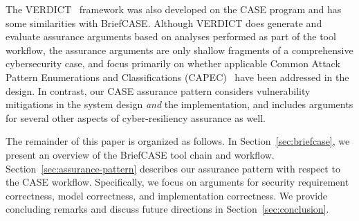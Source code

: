 The VERDICT~\cite{verdict} framework was also developed on the CASE program and has some similarities with BriefCASE.  Although VERDICT does generate and evaluate assurance arguments based on analyses performed as part of the tool workflow, the assurance arguments are only shallow fragments of a comprehensive cybersecurity case, and focus primarily on whether applicable Common Attack Pattern Enumerations and Classifications (CAPEC)~\cite{capec} have been addressed in the design.  In contrast, our CASE assurance pattern considers vulnerability mitigations in the system design \textit{and} the implementation, and includes arguments for several other aspects of cyber-resiliency assurance as well.

The remainder of this paper is organized as follows. In Section~\ref{sec:briefcase}, we present an overview of the BriefCASE tool chain and workflow. Section~\ref{sec:assurance-pattern} describes our assurance pattern with respect to the CASE workflow. Specifically, we focus on arguments for security requirement correctness, model correctness, and implementation correctness.  We provide concluding remarks and discuss future directions in Section~\ref{sec:conclusion}.